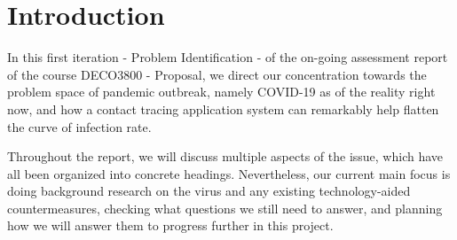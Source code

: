 \section{Introduction}
  \par In this first iteration - Problem Identification - of the on-going assessment report of the course DECO3800 - Proposal, we direct our concentration towards the problem space of pandemic outbreak, namely COVID-19 as of the reality right now, and how a contact tracing application system can remarkably help flatten the curve of infection rate.
  \par Throughout the report, we will discuss multiple aspects of the issue, which have all been organized into concrete headings. Nevertheless, our current main focus is doing background research on the virus and any existing technology-aided countermeasures, checking what questions we still need to answer, and planning how we will answer them to progress further in this project.

